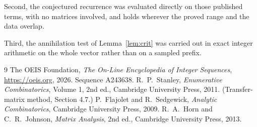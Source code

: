 \documentclass[11pt,a4paper]{article}
\theoremstyle{plain}
\theoremstyle{definition}
\begin{document}
Second, the conjectured recurrence was evaluated directly on those published terms, with no
matrices involved, and holds wherever the proved range and the data overlap.

Third, the annihilation test of Lemma~\ref{lem:crit} was carried out in exact integer
arithmetic on the whole vector rather than on a sampled prefix.

\begin{thebibliography}{9}
 The OEIS Foundation, \emph{The On-Line Encyclopedia of Integer
Sequences}, \url{https://oeis.org}, 2026. Sequence A243638.
 R.~P.~Stanley, \emph{Enumerative Combinatorics}, Volume 1, 2nd ed.,
Cambridge University Press, 2011. (Transfer-matrix method, Section 4.7.)
 P.~Flajolet and R.~Sedgewick, \emph{Analytic Combinatorics}, Cambridge
University Press, 2009.
 R.~A.~Horn and C.~R.~Johnson, \emph{Matrix Analysis}, 2nd ed., Cambridge
University Press, 2013.
\end{thebibliography}
\end{document}
